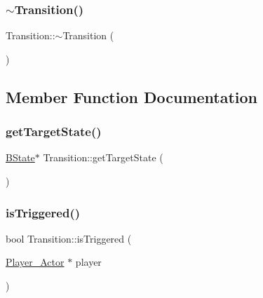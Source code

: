 \mbox{\label{classTransition_ab66e8623f23c71cd4f07c69596427bab}} 
\subsubsection{\texorpdfstring{$\sim$\+Transition()}{~Transition()}}
{\footnotesize\ttfamily Transition\+::$\sim$\+Transition (\begin{DoxyParamCaption}{ }\end{DoxyParamCaption})}



\subsection{Member Function Documentation}
\mbox{\label{classTransition_adf0f4f0f2db192bb9fd83ba5e067e0e6}} 
\subsubsection{\texorpdfstring{get\+Target\+State()}{getTargetState()}}
{\footnotesize\ttfamily \hyperlink{classBState}{B\+State}$\ast$ Transition\+::get\+Target\+State (\begin{DoxyParamCaption}{ }\end{DoxyParamCaption})\hspace{0.3cm}{\ttfamily [inline]}}

\mbox{\label{classTransition_a9c527feeff2364f489b022de20f8cc2d}} 
\subsubsection{\texorpdfstring{is\+Triggered()}{isTriggered()}}
{\footnotesize\ttfamily bool Transition\+::is\+Triggered (\begin{DoxyParamCaption}\item[{\hyperlink{classPlayer__Actor}{Player\+\_\+\+Actor} $\ast$}]{player }\end{DoxyParamCaption})}



